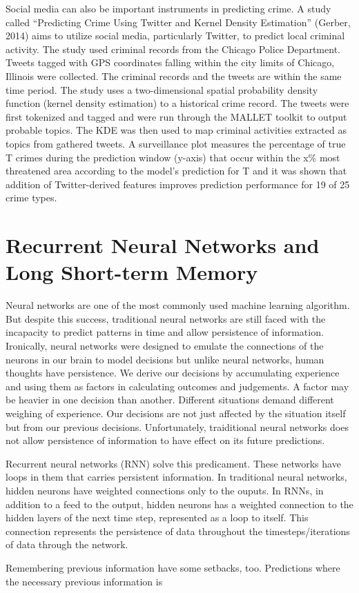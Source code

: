     Social media can also be important instruments in predicting crime. A study called “Predicting Crime Using Twitter and Kernel Density Estimation” (Gerber, 2014) aims to utilize social media, particularly Twitter, to predict local criminal activity. The study used criminal records from the Chicago Police Department. Tweets tagged with GPS coordinates falling within the city limits of Chicago, Illinois were collected. The criminal records and the tweets are within the same time period. The study uses a two-dimensional spatial probability density function (kernel density estimation) to a historical crime record. The tweets were first tokenized and tagged and were run through the MALLET toolkit to output probable topics. The KDE was then used to map criminal activities extracted as topics from gathered tweets. A surveillance plot measures the percentage of true T crimes during the prediction window (y-axis) that occur within the x\% most threatened area according to the model's prediction for T and it was shown that addition of Twitter-derived features improves prediction performance for 19 of 25 crime types.

\section{Recurrent Neural Networks and Long Short-term Memory}

    Neural networks are one of the most commonly used machine learning algorithm. But despite this success, traditional neural networks are still faced with the incapacity to predict patterns in time and allow persistence of information. Ironically, neural networks were designed to emulate the connections of the neurons in our brain to model decisions but unlike neural networks, human thoughts have persistence. We derive our decisions by accumulating experience and using them as factors in calculating outcomes and judgements. A factor may be heavier in one decision than another. Different situations demand different weighing of experience. Our decisions are not just affected by the situation itself but from our previous decisions. Unfortunately, traiditional neural networks does not allow persistence of information to have effect on its future predictions.

    Recurrent neural networks (RNN) solve this predicament. These networks have loops in them that carries persistent information. In traditional neural networks, hidden neurons have weighted connections only to the ouputs. In RNNs, in addition to a feed to the output, hidden neurons has a weighted connection to the hidden layers of the next time step, represented as a loop to itself. This connection represents the persistence of data throughout the timesteps/iterations of data through the network.

    Remembering previous information have some setbacks, too. Predictions where the necessary previous information is 
